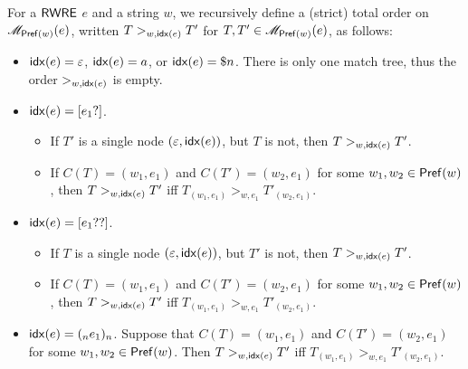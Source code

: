   \begin{definition}\label{def-regex-semantics}
  	For a ${\sf RWRE}$ $e$ and a string $w$, we recursively define a (strict) total order on $\mathscr{M}_{\mathsf{Pref}(w)}(e)$, written $T
  	>_{w,{\sf idx}(e)} T'$ for $T, T' \in \mathscr{M}_{\mathsf{Pref}(w)}(e)$, as follows:
  	\begin{itemize}
  		\item ${\sf idx}(e) = \varepsilon$, ${\sf idx}(e) = a$, or ${\sf idx}(e) = \$ n$. There is only one match tree, thus the
  		order $>_{w, {\sf idx}(e)}$ is empty. %
 		\item ${\sf idx}(e)  = [e_1?]$. 
 		
 		\begin{itemize}
            \item If $T' $ is  a single node $(\varepsilon, {\sf idx}(e))$, but $T$ is not, then $T >_{w, {\sf idx}(e)} T'$.
            
  			\item If $C (T) = (w_1, e_1)$ and $C (T') = (w_2, e_1)$ for some $w_1, w_2 \in \mathsf{Pref}(w)$, then $T >_{w, {\sf idx}(e)} T'$ iff $T_{(w_1, e_1)} >_{w, e_1} T'_{(w_2, e_1)}$.
 		\end{itemize}
 		
 		\item ${\sf idx}(e)  = [e_1??]$. 
 		
 		\begin{itemize}
            \item If $T $ is  a single node $(\varepsilon, {\sf idx}(e))$, but $T'$ is not, then $T >_{w, {\sf idx}(e)} T'$.
%  			
  			\item If $C (T) = (w_1, e_1)$ and $C (T') = (w_2, e_1)$ for some $w_1, w_2 \in \mathsf{Pref}(w)$, then $T >_{w, {\sf idx}(e)} T'$ iff $T_{(w_1, e_1)} >_{w, e_1} T'_{(w_2, e_1)}$.
 		\end{itemize}

  		\item ${\sf idx}(e) = (_n e_1)_n$. Suppose that $C (T) = (w_1, e_1)$ and $C (T') = (w_2, e_1)$ for some $w_1, w_2 \in \mathsf{Pref}(w)$.
  		Then $T >_{w, {\sf idx}(e)} T'$ iff $T_{(w_1, e_1)} >_{w, e_1} T'_{(w_2, e_1)}$.
  		

\end{itemize}
\end{definition}

